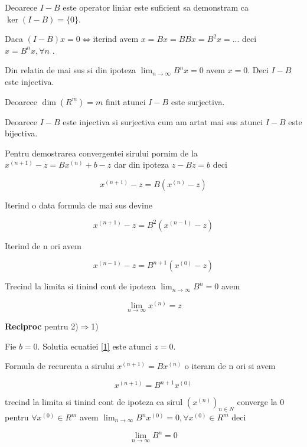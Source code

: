 \documentclass[a4paper,twoside]{book}
\begin{document}
Deoarece $I-B$ este operator liniar este suficient sa demonstram ca $\ker
(I-B)=\{0\}$.

Daca $(I-B)x=0\Leftrightarrow $iterind avem $x=Bx=BBx=B^{2}x=...$ deci $%
x=B^{n}x,\forall n$ .

Din relatia de mai sus si din ipoteza $\lim_{n\rightarrow \infty }B^{n}x=0$
avem $x=0$. Deci $I-B\,\ $este injectiva.

Deoarece $\dim (R^{m})=m$ finit atunci $I-B$ este surjectiva.

Deoarece $I-B$ este injectiva si surjectiva cum am artat mai sus atunci $I-B$
este bijectiva.

Pentru demostrarea convergentei sirului pornim de la $%
x^{(n+1)}-z=Bx^{(n)}+b-z$ dar din ipoteza $z-Bz=b$ deci

\begin{equation*}
x^{(n+1)}-z=B(x^{(n)}-z)
\end{equation*}

Iterind o data formula de mai sus devine

\begin{equation*}
x^{(n+1)}-z=B^{2}(x^{(n-1)}-z)
\end{equation*}

Iterind de n ori avem

\begin{equation*}
x^{(n-1)}-z=B^{n+1}(x^{(0)}-z)
\end{equation*}

Trecind la limita si tinind cont de ipoteza $\lim_{n\rightarrow \infty
}B^{n}=0$ avem

\begin{equation*}
\lim_{n\rightarrow \infty }x^{(n)}=z
\end{equation*}

\textbf{Reciproc} pentru 2)$\Rightarrow $1)

Fie $b=0$. Solutia ecuatiei \ref{1} este atunci $z=0$.

Formula de recurenta a sirului $x^{(n+1)}=Bx^{(n)}$ o iteram de n ori si avem

\begin{equation*}
x^{(n+1)}=B^{n+1}x^{(0)}
\end{equation*}

trecind la limita si tinind cont de ipoteza ca sirul $(x^{(n)})_{n\in N}$
converge la 0 pentru $\forall x^{(0)}\in R^{m}$ avem $\lim_{n\rightarrow
\infty }B^{n}x^{(0)}=0,\forall x^{(0)}\in R^{m}$ deci

\begin{equation*}
\lim_{n\rightarrow \infty }B^{n}=0
\end{equation*}
\end{document}
